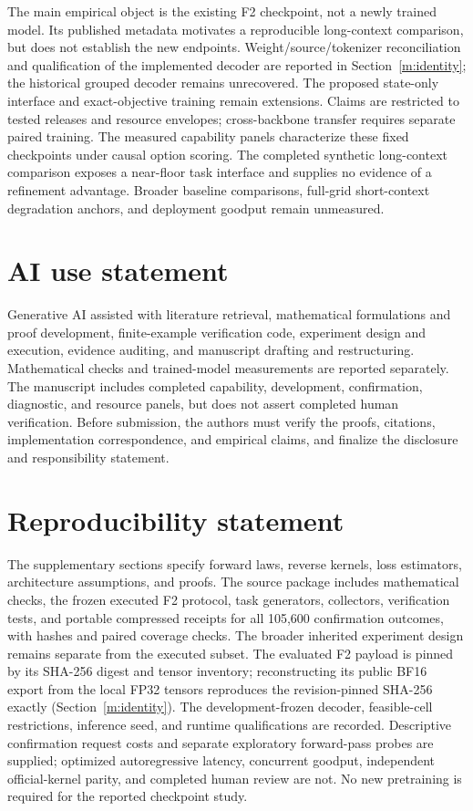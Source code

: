 \documentclass{article}
\theoremstyle{remark}\newtheorem{remark}[theorem]{Remark}
\begin{document}
The main empirical object is the existing F2 checkpoint, not a newly trained model. Its published metadata motivates a reproducible long-context comparison, but does not establish the new endpoints. Weight/source/tokenizer reconciliation and qualification of the implemented decoder are reported in Section~\ref{m:identity}; the historical grouped decoder remains unrecovered. The proposed state-only interface and exact-objective training remain extensions. Claims are restricted to tested releases and resource envelopes; cross-backbone transfer requires separate paired training. The measured capability panels characterize these fixed checkpoints under causal option scoring. The completed synthetic long-context comparison exposes a near-floor task interface and supplies no evidence of a refinement advantage. Broader baseline comparisons, full-grid short-context degradation anchors, and deployment goodput remain unmeasured.
\label{m:mainend}

\clearpage
\section*{AI use statement}
Generative AI assisted with literature retrieval, mathematical formulations and proof development, finite-example verification code, experiment design and execution, evidence auditing, and manuscript drafting and restructuring. Mathematical checks and trained-model measurements are reported separately. The manuscript includes completed capability, development, confirmation, diagnostic, and resource panels, but does not assert completed human verification. Before submission, the authors must verify the proofs, citations, implementation correspondence, and empirical claims, and finalize the disclosure and responsibility statement.

\section*{Reproducibility statement}
The supplementary sections specify forward laws, reverse kernels, loss estimators, architecture assumptions, and proofs. The source package includes mathematical checks, the frozen executed F2 protocol, task generators, collectors, verification tests, and portable compressed receipts for all 105,600 confirmation outcomes, with hashes and paired coverage checks. The broader inherited experiment design remains separate from the executed subset. The evaluated F2 payload is pinned by its SHA-256 digest and tensor inventory; reconstructing its public BF16 export from the local FP32 tensors reproduces the revision-pinned SHA-256 exactly (Section~\ref{m:identity}). The development-frozen decoder, feasible-cell restrictions, inference seed, and runtime qualifications are recorded. Descriptive confirmation request costs and separate exploratory forward-pass probes are supplied; optimized autoregressive latency, concurrent goodput, independent official-kernel parity, and completed human review are not. No new pretraining is required for the reported checkpoint study.
\end{document}
